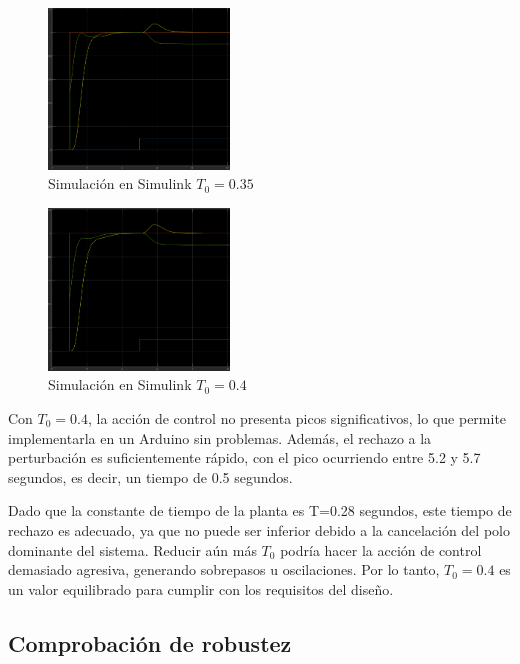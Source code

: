\documentclass[letterpaper, 10 pt, conference]{ieeeconf}  %
\begin{document}
\begin{figure}[H]
  \centering
  \includegraphics[width=0.43\textwidth]{./IMAGENES/pid4.png}
  \caption{Simulación en Simulink \(T_{0} = 0.35\)}
  \label{fig:pid4}
\end{figure}

\begin{figure}[H]
  \centering
  \includegraphics[width=0.43\textwidth]{./IMAGENES/pid5.png}
  \caption{Simulación en Simulink \(T_{0} = 0.4\)}
  \label{fig:pid5}
\end{figure}

Con $T_{0}=0.4$, la acción de control no presenta picos significativos, lo que permite implementarla en un Arduino sin problemas. Además, el rechazo a la perturbación es suficientemente rápido, con el pico ocurriendo entre 5.2 y 5.7 segundos, es decir, un tiempo de 0.5 segundos.

Dado que la constante de tiempo de la planta es T=0.28 segundos, este tiempo de rechazo es adecuado, ya que no puede ser inferior debido a la cancelación del polo dominante del sistema. Reducir aún más $T_{0}$ podría hacer la acción de control demasiado agresiva, generando sobrepasos u oscilaciones. Por lo tanto, $T_{0}=0.4$ es un valor equilibrado para cumplir con los requisitos del diseño.

\subsection{Comprobación de robustez}
\end{document}
